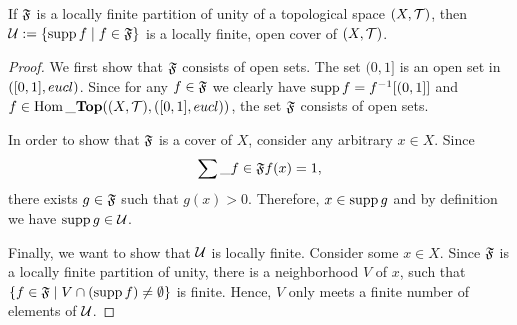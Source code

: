 \begin{lemma}\label{lemma:part\_to\_para}
	If $\mathfrak{F}$ is a locally finite partition of unity of a topological space $\tspace$, then $\mathcal{U} := {\left \{ \operatorname{supp} f \mid f \in \mathfrak{F} \right \}}$ is a locally finite, open cover of $\tspace$. 
\end{lemma}
\begin{proof}
	We first show that $\mathfrak{F}$ consists of open sets. The set $(0,1]$ is an open set in ${\left ( [0,1], eucl \right )}$. Since for any $f \in \mathfrak{F}$ we clearly have $\operatorname{supp} f = f^{-1}{\left [ (0,1] \right ]}$ and $f \in \Hom\_\Top\pbraces{\tspace, \pbraces{[0,1], \eucl}}$, the set $\mathfrak{F}$ consists of open sets. 
	
	In order to show that $\mathfrak{F}$ is a cover of $X$, consider any arbitrary $x \in X$. Since 
	\begin{align*}
		\sum\_{f \in \mathfrak{F}} f(x) = 1,
	\end{align*}
	there exists $g \in \mathfrak{F}$ such that $g(x) > 0$. Therefore, $x \in \operatorname{supp} g$ and by definition we have $\operatorname{supp} g \in \mathcal{U}$. 
	
	Finally, we want to show that $\mathcal{U}$ is locally finite. Consider some $x \in X$. Since $\mathfrak{F}$ is a locally finite partition of unity, there is a neighborhood $V$ of $x$, such that ${\left \{ f \in \mathfrak{F} \mid V \cap {\left ( \operatorname{supp}f \right )} \neq \emptyset \right \}}$ is finite. Hence, $V$ only meets a finite number of elements of $\mathcal{U}$. 
\end{proof}

